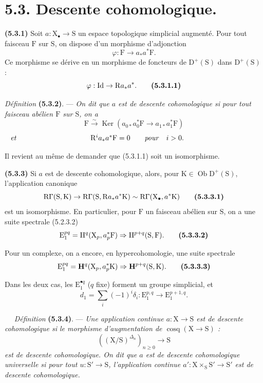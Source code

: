 \documentclass[11pt,leqno]{article}
\newcommand{\Page}[1]{\ifvmode\noindent\else\unskip\ \fi{\footnotesize\textcolor{gray}{[p.\,#1]}}\ \ignorespaces}
\begin{document}
\section*{5.3. Descente cohomologique.}

\textbf{(5.3.1)} Soit \(a:\mathrm{X}_{\bullet}\to\mathrm{S}\) un espace topologique simplicial augmenté. Pour tout faisceau \(\mathrm{F}\) sur \(\mathrm{S}\), on dispose d’un morphisme d’adjonction
\[
\varphi:\mathrm{F}\to a_*a^*\mathrm{F}.
\]
Ce morphisme se dérive en un morphisme de foncteurs de \(\mathrm{D}^{+}(\mathrm{S})\) dans \(\mathrm{D}^{+}(\mathrm{S})\) :
\[
\varphi:\mathrm{Id}\to\mathrm{R}a_*a^*.
\tag*{\textbf{(5.3.1.1)}}
\]

\textit{Définition} \textbf{(5.3.2)}. — \textit{On dit que \(a\) est de \textup{descente cohomologique} si pour tout faisceau abélien \(\mathrm{F}\) sur \(\mathrm{S}\), on a}
\[
\mathrm{F}\xrightarrow{\sim}
\operatorname{Ker}(a_{0*}a_{0}^{*}\mathrm{F}\to a_{1*}a_{1}^{*}\mathrm{F})
\]
\[
\makebox[\linewidth]{\textit{et}\hfill
\(\mathrm{R}^{i}a_*a^*\mathrm{F}=0
\qquad\text{\textit{pour}}\quad i>0.\)\hfill}
\]

Il revient au même de demander que (5.3.1.1) soit un isomorphisme.

\textbf{(5.3.3)} Si \(a\) est de descente cohomologique, alors, pour \(\mathrm{K}\in\operatorname{Ob}\mathrm{D}^{+}(\mathrm{S})\), l’application canonique
\[
\mathrm{R}\Gamma(\mathrm{S},\mathrm{K})
\to\mathrm{R}\Gamma(\mathrm{S},\mathrm{R}a_*a^*\mathrm{K})
\sim\mathrm{R}\Gamma(\mathrm{X}_{\bullet},a^*\mathrm{K})
\tag*{\textbf{(5.3.3.1)}}
\]
est un isomorphisme. En particulier, pour \(\mathrm{F}\) un faisceau abélien sur \(\mathrm{S}\), on a une suite spectrale (5.2.3.2)
\[
\mathrm{E}_{1}^{pq}=\mathrm{H}^{q}(\mathrm{X}_{p},a_{p}^{*}\mathrm{F})
\Rightarrow\mathrm{H}^{p+q}(\mathrm{S},\mathrm{F}).
\tag*{\textbf{(5.3.3.2)}}
\]

Pour un complexe, on a encore, en hypercohomologie, une suite spectrale
\[
\mathrm{E}_{1}^{pq}=\mathbf{H}^{q}(\mathrm{X}_{p},a_{p}^{*}\mathrm{K})
\Rightarrow\mathbf{H}^{p+q}(\mathrm{S},\mathrm{K}).
\tag*{\textbf{(5.3.3.3)}}
\]

Dans les deux cas, les \(\mathrm{E}_{1}^{\bullet q}\) (\(q\) fixe) forment un groupe simplicial, et
\[
d_{1}=\sum_i(-1)^i\delta_i:
\mathrm{E}_{1}^{p,q}\to\mathrm{E}_{1}^{p+1,q}.
\]

\Page{15}
\textit{Définition} \textbf{(5.3.4)}. — \textit{Une application continue \(a:\mathrm{X}\to\mathrm{S}\) est de \textup{descente cohomologique} si le morphisme d’augmentation de \(\operatorname{cosq}(\mathrm{X}\to\mathrm{S})\) :}
\[
((\mathrm{X}/\mathrm{S})^{\Delta_n})_{n\geq 0}\to\mathrm{S}
\]
\textit{est de descente cohomologique. On dit que \(a\) est de \textup{descente cohomologique universelle} si pour tout \(u:\mathrm{S}'\to\mathrm{S}\), l’application continue \(a':\mathrm{X}\times_{\mathrm{S}}\mathrm{S}'\to\mathrm{S}'\) est de descente cohomologique.}
\end{document}
